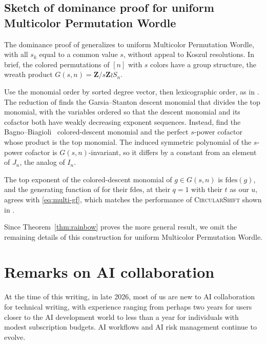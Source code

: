 \documentclass[12pt]{amsart}
\theoremstyle{definition}
\theoremstyle{remark}
\newcommand\rainbow{Multicolor Permutation Wordle\xspace}
\newcommand\basicstrat{\mbox{\textnormal{\textsc{CircularShift}}}\xspace}
\newcommand{\Z}{\mathbf Z}
\newcommand\KSV{monthly-kutin-smithline-vatter}
\begin{document}
\subsection{Sketch of dominance proof for uniform \rainbow}\label{subsec:unif_rainbow}

        The dominance proof of \cite{\KSV} generalizes to uniform \rainbow,
    with all $s_k$ equal to a common value $s$, without appeal to Koszul
    resolutions.  In brief, the colored permutations of $[n]$ with $s$ colors
    have a group structure, the wreath product $G(s, n) = \Z/s\Z \wr S_n$.

    Use the monomial order by sorted degree vector, then lexicographic order,
    as in \cite{\KSV}.
    The reduction of \cite{\KSV} finds the Garsia--Stanton
    descent monomial that divides the top monomial,
    with the variables ordered so that the descent monomial and its cofactor
    both have weakly decreasing exponent sequences.
    Instead, find the Bagno--Biagioli~\cite{bagno2007colored} colored-descent
    monomial and the perfect $s$-power cofactor whose product is the top monomial.
    The induced symmetric polynomial of the $s$-power cofactor is $G(s, n)$-invariant,
    so it differs by a constant from an element of $J_n$, the analog of $I_n$.
     
The top exponent of the colored-descent monomial of $g\in G(s,n)$ is
    $\mathrm{fdes}(g)$, and the generating function of
    \cite[Theorem~A.1]{bagno2007colored} for their $\mathrm{fdes}$, at their $q = 1$
    with their $t$ as our $u$, agrees with \eqref{eq:multi-gf}, which matches
    the performance of \basicstrat shown in
    \cite[Theorem~4.7]{arxiv-kutin-smithline}.
    
    Since Theorem~\ref{thm:rainbow} proves the more general result, 
    we omit the remaining details of this construction for uniform \rainbow.
    
\section{Remarks on AI collaboration}\label{sec:conclusion}


 
At the time of this writing, in late 2026, most of us are new to
AI collaboration for technical writing, with experience ranging from perhaps two years
for users closer to the AI development world to less than a year for
individuals with modest subscription budgets.
AI workflows and AI risk management continue to evolve.
\end{document}
